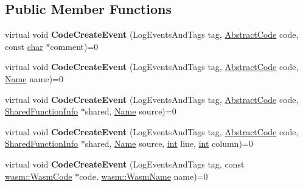 \subsection*{Public Member Functions}
\begin{DoxyCompactItemize}
\item 
\mbox{\label{classv8_1_1internal_1_1CodeEventListener_a691d600c90b0a59f54eb7e4fbb3b5e33}} 
virtual void {\bfseries Code\+Create\+Event} (Log\+Events\+And\+Tags tag, \mbox{\hyperlink{classv8_1_1internal_1_1AbstractCode}{Abstract\+Code}} code, const \mbox{\hyperlink{classchar}{char}} $\ast$comment)=0
\item 
\mbox{\label{classv8_1_1internal_1_1CodeEventListener_a22b45aa4476df2a7adc568d516792fbf}} 
virtual void {\bfseries Code\+Create\+Event} (Log\+Events\+And\+Tags tag, \mbox{\hyperlink{classv8_1_1internal_1_1AbstractCode}{Abstract\+Code}} code, \mbox{\hyperlink{classv8_1_1internal_1_1Name}{Name}} name)=0
\item 
\mbox{\label{classv8_1_1internal_1_1CodeEventListener_afdffa910835c4bd280cb7c4bffe22337}} 
virtual void {\bfseries Code\+Create\+Event} (Log\+Events\+And\+Tags tag, \mbox{\hyperlink{classv8_1_1internal_1_1AbstractCode}{Abstract\+Code}} code, \mbox{\hyperlink{classv8_1_1internal_1_1SharedFunctionInfo}{Shared\+Function\+Info}} $\ast$shared, \mbox{\hyperlink{classv8_1_1internal_1_1Name}{Name}} source)=0
\item 
\mbox{\label{classv8_1_1internal_1_1CodeEventListener_a33f828d791f39395654ec647b0bce461}} 
virtual void {\bfseries Code\+Create\+Event} (Log\+Events\+And\+Tags tag, \mbox{\hyperlink{classv8_1_1internal_1_1AbstractCode}{Abstract\+Code}} code, \mbox{\hyperlink{classv8_1_1internal_1_1SharedFunctionInfo}{Shared\+Function\+Info}} $\ast$shared, \mbox{\hyperlink{classv8_1_1internal_1_1Name}{Name}} source, \mbox{\hyperlink{classint}{int}} line, \mbox{\hyperlink{classint}{int}} column)=0
\item 
\mbox{\label{classv8_1_1internal_1_1CodeEventListener_a3e06d2a597924ac0d22e38c96c101407}} 
virtual void {\bfseries Code\+Create\+Event} (Log\+Events\+And\+Tags tag, const \mbox{\hyperlink{classv8_1_1internal_1_1wasm_1_1WasmCode}{wasm\+::\+Wasm\+Code}} $\ast$code, \mbox{\hyperlink{classv8_1_1internal_1_1Vector}{wasm\+::\+Wasm\+Name}} name)=0

\end{DoxyCompactItemize}
